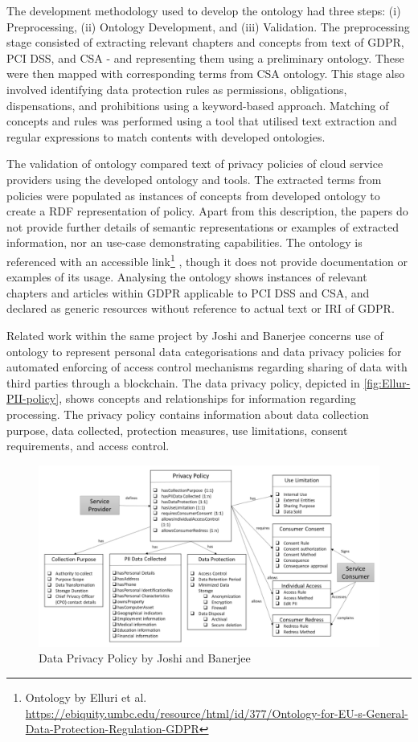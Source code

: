 The development methodology used to develop the ontology had three steps: (i) Preprocessing, (ii) Ontology Development, and (iii) Validation. The preprocessing stage consisted of extracting relevant chapters and concepts from text of GDPR, PCI DSS, and CSA - and representing them using a preliminary ontology. These were then mapped with corresponding terms from CSA ontology. This stage also involved identifying data protection rules as permissions, obligations, dispensations, and prohibitions using a keyword-based approach. Matching of concepts and rules was performed using a tool that utilised text extraction and regular expressions to match contents with developed ontologies.

The validation of ontology compared text of privacy policies of cloud
service providers using the developed ontology and tools. The
extracted terms from policies were populated as instances of concepts
from developed ontology to create a RDF representation of
policy. Apart from this description, the papers do not provide further
details of semantic representations or examples of extracted
information, nor an use-case demonstrating capabilities. The ontology
is referenced with an accessible link\footnote{Ontology by Elluri et al. \url{https://ebiquity.umbc.edu/resource/html/id/377/Ontology-for-EU-s-General-Data-Protection-Regulation-GDPR}} \cite{elluri_knowledge_2018}, though it does not provide documentation or examples of its usage. Analysing the ontology shows instances of relevant chapters and articles within GDPR applicable to PCI DSS and CSA, and declared as generic resources without reference to actual text or IRI of GDPR.

Related work within the same project by Joshi and Banerjee  \cite{joshi_automating_2019} concerns use of ontology to represent personal data categorisations and data privacy policies for automated enforcing of access control mechanisms regarding sharing of data with third parties through a blockchain. The data privacy policy, depicted in \autoref{fig:Ellur-PII-policy}, shows concepts and relationships for information regarding processing. The privacy policy contains information about data collection purpose, data collected, protection measures, use limitations, consent requirements, and access control.
\begin{figure}[htbp]
    \centering
    \includegraphics[width=\linewidth]{img/Elluri_PII_policy.png}
    \caption{Data Privacy Policy by Joshi and Banerjee \cite{joshi_automating_2019}}
    \label{fig:Ellur-PII-policy}
\end{figure}

